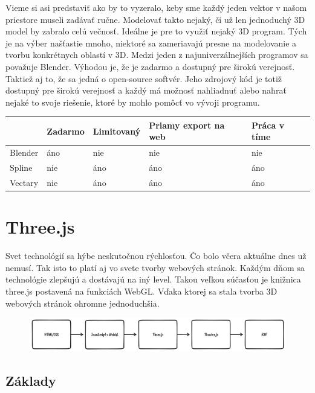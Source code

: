 \documentclass[10pt,oneside,slovak,a4paper]{article}
\begin{document}
Vieme si asi predstaviť ako by to vyzeralo, keby sme každý jeden vektor v našom priestore museli zadávať ručne.
Modelovať takto nejaký, či už len jednoduchý 3D model by zabralo celú večnosť. Ideálne je pre to využiť nejaký 3D program.
Tých je na výber našťastie mnoho, niektoré sa zameriavajú presne na modelovanie a tvorbu konkrétnych oblastí v 3D.
Medzi jeden z najuniverzálnejších programov sa považuje Blender. Výhodou je, že je zadarmo a dostupný pre širokú verejnosť.
Taktiež aj to, že sa jedná o open-source softvér. Jeho zdrojový kód je totiž dostupný pre širokú verejnosť a každý má možnosť nahliadnuť alebo nahrať nejaké to svoje riešenie, ktoré by mohlo pomôcť vo vývoji programu.

\begin{table}[ht]
	\begin{tabular}{|l|l|l|l|l|}
		\hline
		        & Zadarmo & Limitovaný & Priamy export na web & Práca v tíme \\ \hline
		Blender & áno     & nie        & nie                  & nie          \\ \hline
		Spline  & nie     & áno        & áno                  & áno          \\ \hline
		Vectary & nie     & áno        & áno                  & áno          \\ \hline
	\end{tabular}
\end{table}

\section{Three.js}

Svet technológií sa hýbe neskutočnou rýchlosťou. Čo bolo včera aktuálne dnes už nemusí. Tak isto to platí aj vo svete tvorby webových stránok.
Každým dňom sa technológie zlepšujú a dostávajú na iný level. Takou veľkou súčasťou je knižnica three.js postavená na funkciách WebGL.
Vďaka ktorej sa stala tvorba 3D webových stránok ohromne jednoduchšia.

\begin{figure}[h]
	\includegraphics[width=1\textwidth]{diagram.pdf}
\end{figure}

\subsection{Základy}
\end{document}
